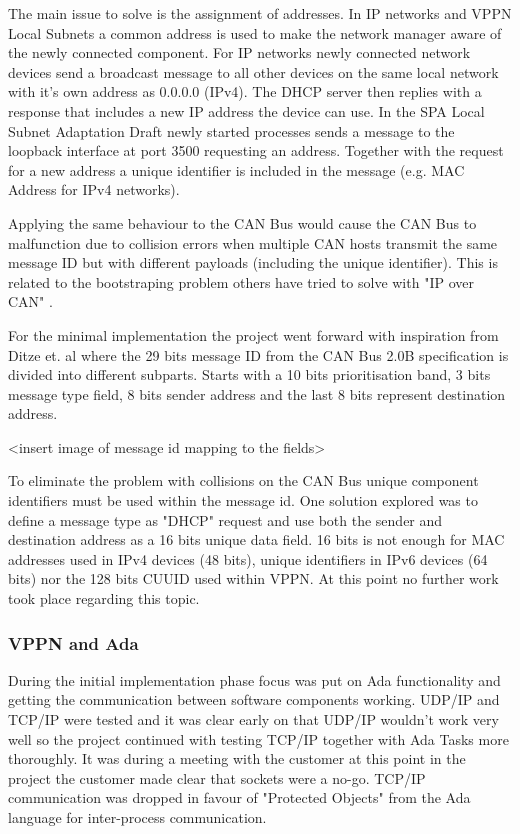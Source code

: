 The main issue to solve is the assignment of addresses. In IP networks and VPPN Local
Subnets a common address is used to make the network manager aware of the newly
connected component. For IP networks newly connected network devices send a
broadcast message to all other devices on the same local network with it's own
address as 0.0.0.0 (IPv4). The DHCP server then replies with a response that
includes a new IP address the device can use. In the SPA Local Subnet
Adaptation Draft newly started processes sends a message to the loopback
interface at port 3500 requesting an address. Together with the request for a
new address a unique identifier is included in the message (e.g. MAC Address
for IPv4 networks).

Applying the same behaviour to the CAN Bus would cause the CAN Bus to
malfunction due to collision errors when multiple CAN hosts transmit the same
message ID but with different payloads (including the unique identifier).
This is related to the bootstraping problem others have tried to solve with
"IP over CAN" \cite{web:draft-ip_over_can, web:porting_ip_can}.

For the minimal implementation the project went forward with inspiration from
Ditze et. al \cite{web:porting_ip_can} where the 29 bits message ID from the
CAN Bus 2.0B specification is divided into different subparts. Starts with a 10
bits prioritisation band, 3 bits message type field, 8 bits sender address and
the last 8 bits represent destination address.

<insert image of message id mapping to the fields>

To eliminate the problem with collisions on the CAN Bus unique component
identifiers must be used within the message id. One solution explored was to
define a message type as "DHCP" request and use both the sender and destination
address as a 16 bits unique data field. 16 bits is not enough for MAC addresses
used in IPv4 devices (48 bits), unique identifiers in IPv6 devices (64 bits)
nor the 128 bits CUUID used within VPPN. At this point no further work took
place regarding this topic.

\subsubsection{VPPN and Ada}
During the initial implementation phase focus was put on Ada functionality and
getting the communication between software components working. UDP/IP and TCP/IP
were tested and it was clear early on that UDP/IP wouldn't work very well so
the project continued with testing TCP/IP together with Ada Tasks more
thoroughly. It was during a meeting with the customer at this point in the
project the customer made clear that sockets were a no-go. TCP/IP communication
was dropped in favour of "Protected Objects" from the Ada language for
inter-process communication.

